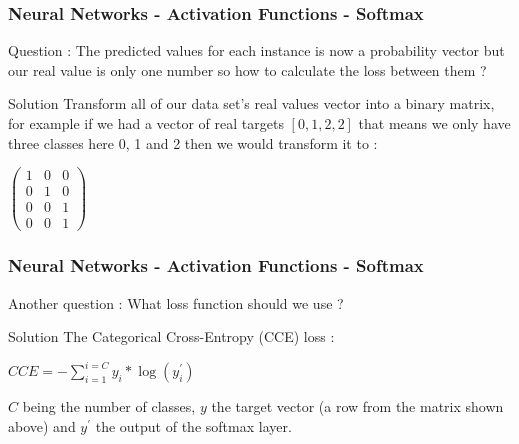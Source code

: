 \documentclass{beamer}
\begin{document}
\begin{frame}
\frametitle{Neural Networks - Activation Functions - Softmax}
Question : The predicted values for each instance is now a probability vector but our real value is only one number so how to calculate the loss between them ?\\
\begin{block}{Solution}
Transform all of our data set's real values vector into a binary matrix, for example if we had a vector of real targets $ [0,1,2,2] $ that means we only have three classes here 0, 1 and 2 then we would transform it to :
\begin{center}
$\begin{pmatrix}
1 & 0 & 0\\
0 & 1 & 0\\
0 & 0 & 1\\
0 & 0 & 1
\end{pmatrix}$
\end{center}
\end{block}
\end{frame}

\begin{frame}
\frametitle{Neural Networks - Activation Functions - Softmax}
Another question : What loss function should we use ?\\
\begin{block}{Solution}
The Categorical Cross-Entropy (CCE) loss :
\begin{center}
$ CCE = -\sum_{i=1}^{i=C}y_i*\log(y^{\prime}_i) $
\end{center}
$ C $ being the number of classes, $ y $ the target vector (a row from the matrix shown above) and $ y^{\prime} $ the output of the softmax layer.
\end{block}
\end{frame}
\end{document}
